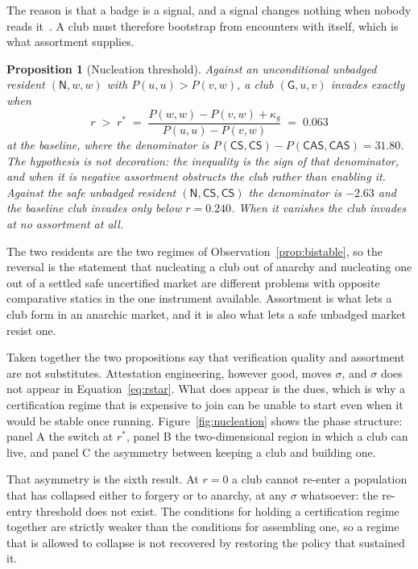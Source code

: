 \documentclass[11pt,a4paper]{article}
\newtheorem{proposition}[theorem]{Proposition}
\theoremstyle{definition}
\newcommand{\CS}{\textsf{CS}}
\newcommand{\CAS}{\textsf{CAS}}
\begin{document}
The reason is that a badge is a signal, and a signal changes nothing when
nobody reads it~\citep{katz1985network}. A club must therefore bootstrap from encounters with itself,
which is what assortment supplies.

\begin{proposition}[Nucleation threshold]
\label{prop:nucleation}
Against an unconditional unbadged resident $(\mathsf{N}, w, w)$ with
$P(u,u) > P(v,w)$, a club $(\mathsf{G}, u, v)$ invades exactly when
\begin{equation}
\label{eq:rstar}
r \;>\; r^{*} \;=\; \frac{P(w,w) - P(v,w) + \kappa_g}{P(u,u) - P(v,w)}
  \;=\; 0.063
\end{equation}
at the baseline, where the denominator is
$P(\CS,\CS) - P(\CAS,\CAS) = 31.80$. The hypothesis is not decoration: the
inequality is the sign of that denominator, and when it is negative assortment
obstructs the club rather than enabling it. Against the \emph{safe} unbadged
resident $(\mathsf{N}, \CS, \CS)$ the denominator is $-2.63$ and the baseline
club invades only \emph{below} $r = 0.240$. When it vanishes the club invades
at no assortment at all.
\end{proposition}

The two residents are the two regimes of Observation~\ref{prop:bistable}, so
the reversal is the statement that nucleating a club out of anarchy and
nucleating one out of a settled safe uncertified market are different problems
with opposite comparative statics in the one instrument available. Assortment
is what lets a club form in an anarchic market, and it is also what lets a safe
unbadged market resist one.

Taken together the two propositions say that verification quality and
assortment are not substitutes. Attestation engineering, however good, moves
$\sigma$, and $\sigma$ does not appear in Equation~\eqref{eq:rstar}. What does
appear is the dues, which is why a certification regime that is expensive to
join can be unable to start even when it would be stable once running.
Figure~\ref{fig:nucleation} shows the phase structure: panel A the switch at
$r^{*}$, panel B the two-dimensional region in which a club can live, and
panel C the asymmetry between keeping a club and building one.

That asymmetry is the sixth result. At $r = 0$ a club cannot re-enter a
population that has collapsed either to forgery or to anarchy, at any $\sigma$
whatsoever: the re-entry threshold does not exist. The conditions for holding a
certification regime together are strictly weaker than the conditions for
assembling one, so a regime that is allowed to collapse is not recovered by
restoring the policy that sustained it.
\end{document}
